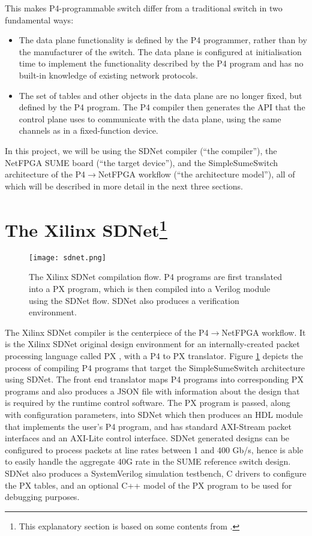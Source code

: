 This makes P4-programmable switch differ from a traditional switch in two fundamental ways:
\begin{itemize}[leftmargin=*, noitemsep]
	\item The data plane functionality is defined by the P4 programmer, rather than by the manufacturer of the switch. The data plane is configured at initialisation time to implement the functionality described by the P4 program and has no built-in knowledge of existing network protocols.
	\item The set of tables and other objects in the data plane are no longer fixed, but defined by the P4 program. The P4 compiler then generates the API that the control plane uses to communicate with the data plane, using the same channels as in a fixed-function device.
\end{itemize}

In this project, we will be using the SDNet compiler (``the compiler''), the NetFPGA SUME board (``the target device''), and the SimpleSumeSwitch architecture of the P4$\rightarrow$NetFPGA workflow (``the architecture model''), all of which will be described in more detail in the next three sections.

\section[The Xilinx SDNet]{The Xilinx SDNet\footnote{This explanatory section is based on some contents from \cite{fpga19,workflow}.}}
\label{sec:sdnet}
\begin{figure}[!h]
	\centering
	\texttt{[image: sdnet.png]}
	\caption{The Xilinx SDNet compilation flow. P4 programs are first translated into a PX program, which is then compiled into a Verilog module using the SDNet flow. SDNet also produces a verification environment.}
	\label{fig:sdnet}
\end{figure}

The Xilinx SDNet compiler is the centerpiece of the P4$\rightarrow$NetFPGA workflow. It is the Xilinx SDNet original design environment for an internally-created packet processing language called PX \cite{px}, with a P4 to PX translator. Figure \ref{fig:sdnet} depicts the process of compiling P4 programs that target the SimpleSumeSwitch architecture using SDNet. The front end translator maps P4 programs into corresponding PX programs and also produces a JSON file with information about the design that is required by the runtime control software. The PX program is passed, along with configuration parameters, into SDNet which then produces an HDL module that implements the user’s P4 program, and has standard AXI-Stream packet interfaces and an AXI-Lite control interface. SDNet generated designs can be configured to process packets at line rates between 1 and 400 Gb/s, hence is able to easily handle the aggregate 40G rate in the SUME reference switch design. SDNet also produces a SystemVerilog simulation testbench, C drivers to configure the PX tables, and an optional C++ model of the PX program to be used for debugging purposes.

